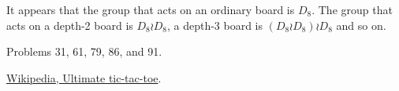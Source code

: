 \documentclass{article}
\begin{document}
\begin{note}
  It appears that the group that acts on an ordinary board is $D_8$.
  The group that acts on a depth-2 board is $D_8 \wr D_8$, a depth-3 board is
  $(D_8 \wr D_8) \wr D_8 $ and so on.
\end{note}
\begin{references}
  \item Problems 31, 61, 79, 86, and 91.
  \item \href{https://en.wikipedia.org/wiki/Ultimate_tic-tac-toe}{Wikipedia, Ultimate tic-tac-toe}.
\end{references}
\end{document}
